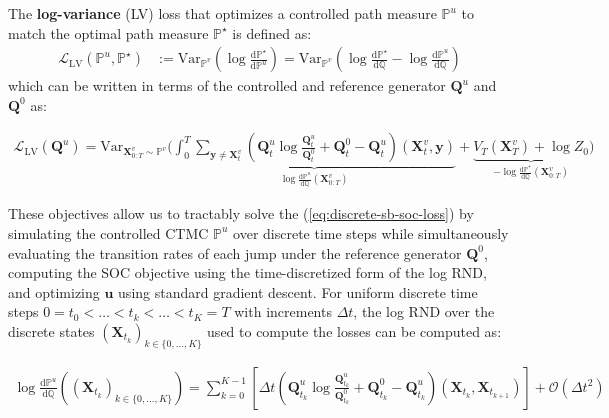 \documentclass{article}
\begin{document}
\begin{definition}
    The \textbf{log-variance} (LV) loss that optimizes a controlled path measure $\mathbb{P}^u$ to match the optimal path measure $\mathbb{P}^\star$ is defined as:
    \begin{align}
        \mathcal{L}_{\text{LV}}(\mathbb{P}^u, \mathbb{P}^\star)&:=\text{Var}_{\mathbb{P}^v}\left(\log \frac{\mathrm{d}\mathbb{P}^\star}{\mathrm{d}\mathbb{P}^u}\right)=\text{Var}_{\mathbb{P}^v}\left(\log \frac{\mathrm{d}\mathbb{P}^\star}{\mathrm{d}\mathbb{Q}}-\log \frac{\mathrm{d}\mathbb{P}^u}{\mathrm{d}\mathbb{Q}}\right)
    \end{align}
    which can be written in terms of the controlled and reference generator $\boldsymbol{Q}^u$ and $\boldsymbol{Q}^0$ as:
    \begin{small}
    \begin{align}
        \mathcal{L}_{\text{LV}}(\boldsymbol{Q}^u)=\text{Var}_{\boldsymbol{X}_{0:T}^v\sim \mathbb{P}^v}\bigg(\underbrace{\int_0^T\sum_{\boldsymbol{y}\neq \boldsymbol{X}^v_t}\left(\boldsymbol{Q}_t^u\log \frac{\boldsymbol{Q}^u_t}{\boldsymbol{Q}^0_t}+\boldsymbol{Q}_t^0-\boldsymbol{Q}_t^u\right)(\boldsymbol{X}^v_t,\boldsymbol{y})}_{\log \frac{\mathrm{d}\mathbb{P}^u}{\mathrm{d}\mathbb{Q}}(\boldsymbol{X}^v_{0:T})}+\underbrace{V_T(\boldsymbol{X}^v_T)+\log Z_0}_{-\log \frac{\mathrm{d}\mathbb{P}^\star}{\mathrm{d}\mathbb{Q}}(\boldsymbol{X}^v_{0:T})}\bigg)\label{eq:discrete-log-variance}
    \end{align}
    \end{small}
\end{definition}
These objectives allow us to tractably solve the (\ref{eq:discrete-sb-soc-loss}) by simulating the controlled CTMC $\mathbb{P}^u$ over discrete time steps while simultaneously evaluating the transition rates of each jump under the reference generator $\boldsymbol{Q}^0$, computing the SOC objective using the time-discretized form of the log RND, and optimizing $\boldsymbol{u}$ using standard gradient descent. For uniform discrete time steps $0=t_0< \dots< t_k< \dots< t_K=T$ with increments $\Delta t$, the log RND over the discrete states $(\boldsymbol{X}_{t_k})_{k\in \{0, \dots, K\}}$ used to compute the losses can be computed as: 
\begin{small}
\begin{align}
    \log \frac{\mathrm{d}\mathbb{P}^u}{\mathrm{d}\mathbb{Q}}((\boldsymbol{X}_{t_k})_{k\in \{0, \dots, K\}})=\sum_{k=0}^{K-1}\left[\Delta t\left(\boldsymbol{Q}_{t_k}^u\log \frac{\boldsymbol{Q}^u_{t_k}}{\boldsymbol{Q}^0_{t_k}}+\boldsymbol{Q}_{t_k}^0- \boldsymbol{Q}_{t_k}^u\right)(\boldsymbol{X}_{t_k},\boldsymbol{X}_{t_{k+1}})\right]+\mathcal{O}(\Delta t^2)\tag{Discretized Log RND}\label{eq:discretized-logrnd}
\end{align}
\end{small}
\end{document}
